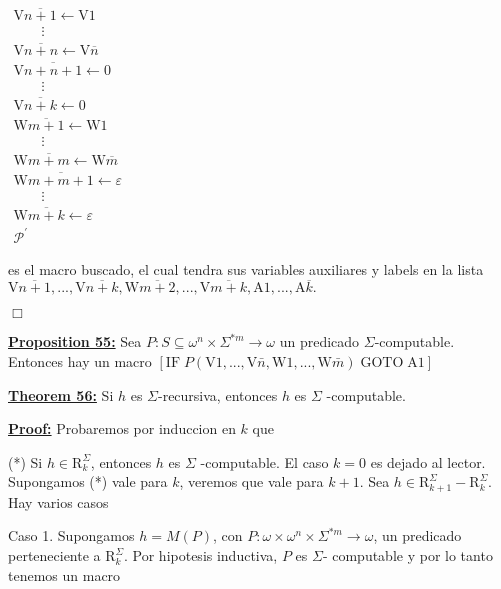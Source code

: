 \(\displaystyle \begin{array}{l} \mathrm{V}\overline{n+1}\leftarrow \mathrm{V}1 \\ \ \ \ \ \ \ \ \ \ \vdots \\ \mathrm{V}\overline{n+n}\leftarrow \mathrm{V}\overline{n} \\ \mathrm{V}\overline{n+n+1}\leftarrow 0 \\ \ \ \ \ \ \ \ \ \ \vdots \\ \mathrm{V}\overline{n+k}\leftarrow 0 \\ \mathrm{W}\overline{m+1}\leftarrow \mathrm{W}1 \\ \ \ \ \ \ \ \ \ \ \vdots \\ \mathrm{W}\overline{m+m}\leftarrow \mathrm{W}\overline{m} \\ \mathrm{W}\overline{m+m+1}\leftarrow \varepsilon \\ \ \ \ \ \ \ \ \ \ \vdots \\ \mathrm{W}\overline{m+k}\leftarrow \varepsilon \\ \mathcal{P}^{\prime } \end{array} \)

es el macro buscado, el cual tendra sus variables auxiliares y labels en la lista
\(\displaystyle \mathrm{V}\overline{n+1},...,\mathrm{V}\overline{n+k},\mathrm{W}\overline{m+2 },...,\mathrm{V}\overline{m+k},\mathrm{A}1,...,\mathrm{A}\overline{k}. \)

\(\Box\)




\textbf{\underline{Proposition 55:}} Sea \(P:S\subseteq \omega ^{n}\times \Sigma ^{\ast m}\rightarrow \omega \) un predicado \(\Sigma \)-computable. Entonces hay un macro
\(\displaystyle \left[ \mathrm{IF}\;P(\mathrm{V}1,...,\mathrm{V}\bar{n},\mathrm{W}1,..., \mathrm{W}\bar{m})\;\mathrm{GOTO}\;\mathrm{A}1\right] \)



\textbf{\underline{Theorem 56:}} Si \(h\) es \(\Sigma \)-recursiva, entonces \(h\) es \(\Sigma \) -computable.

\textbf{\underline{Proof:}} Probaremos por induccion en \(k\) que

(*) Si \(h\in \mathrm{R}_{k}^{\Sigma }\), entonces \(h\) es \(\Sigma \) -computable.
El caso \(k=0\) es dejado al lector. Supongamos (*) vale para \(k\), veremos que vale para \(k+1\). Sea \(h\in \mathrm{R}_{k+1}^{\Sigma }-\mathrm{R} _{k}^{\Sigma }.\) Hay varios casos

Caso 1. Supongamos \(h=M(P)\), con \(P:\omega \times \omega ^{n}\times \Sigma ^{\ast m}\rightarrow \omega \), un predicado perteneciente a \(\mathrm{R} _{k}^{\Sigma }\). Por hipotesis inductiva, \(P\) es \(\Sigma \)- computable y por lo tanto tenemos un macro

